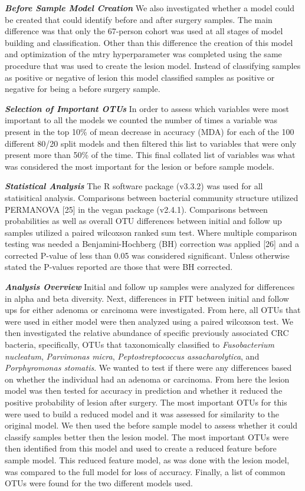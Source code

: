 \documentclass[12pt,]{article}
\begin{document}
\textbf{\emph{Before Sample Model Creation}} We also investigated
whether a model could be created that could identify before and after
surgery samples. The main difference was that only the 67-person cohort
was used at all stages of model building and classification. Other than
this difference the creation of this model and optimization of the mtry
hyperparameter was completed using the same procedure that was used to
create the lesion model. Instead of classifying samples as positive or
negative of lesion this model classified samples as positive or negative
for being a before surgery sample.

\textbf{\emph{Selection of Important OTUs}} In order to assess which
variables were most important to all the models we counted the number of
times a variable was present in the top 10\% of mean decrease in
accuracy (MDA) for each of the 100 different 80/20 split models and then
filtered this list to variables that were only present more than 50\% of
the time. This final collated list of variables was what was considered
the most important for the lesion or before sample models.

\textbf{\emph{Statistical Analysis}} The R software package (v3.3.2) was
used for all statisitical analysis. Comparisons between bacterial
community structure utilized PERMANOVA {[}25{]} in the vegan package
(v2.4.1). Comparisons between probabilities as well as overall OTU
differences between initial and follow up samples utilized a paired
wilcoxson ranked sum test. Where multiple comparison testing was needed
a Benjamini-Hochberg (BH) correction was applied {[}26{]} and a
corrected P-value of less than 0.05 was considered significant. Unless
otherwise stated the P-values reported are those that were BH corrected.

\textbf{\emph{Analysis Overview}} Initial and follow up samples were
analyzed for differences in alpha and beta diversity. Next, differences
in FIT between initial and follow ups for either adenoma or carcinoma
were investigated. From here, all OTUs that were used in either model
were then analyzed using a paired wilcoxson test. We then investigated
the relative abundance of specific previously associated CRC bacteria,
specifically, OTUs that taxonomically classified to \emph{Fusobacterium
nucleatum}, \emph{Parvimonas micra}, \emph{Peptostreptococcus
assacharolytica}, and \emph{Porphyromonas stomatis}. We wanted to test
if there were any differences based on whether the individual had an
adenoma or carcinoma. From here the lesion model was then tested for
accuracy in prediction and whether it reduced the positive probability
of lesion after surgery. The most important OTUs for this were used to
build a reduced model and it was assessed for similarity to the original
model. We then used the before sample model to assess whether it could
classify samples better then the lesion model. The most important OTUs
were then identified from this model and used to create a reduced
feature before sample model. This reduced feature model, as was done
with the lesion model, was compared to the full model for loss of
accuracy. Finally, a list of common OTUs were found for the two
different models used.
\end{document}
